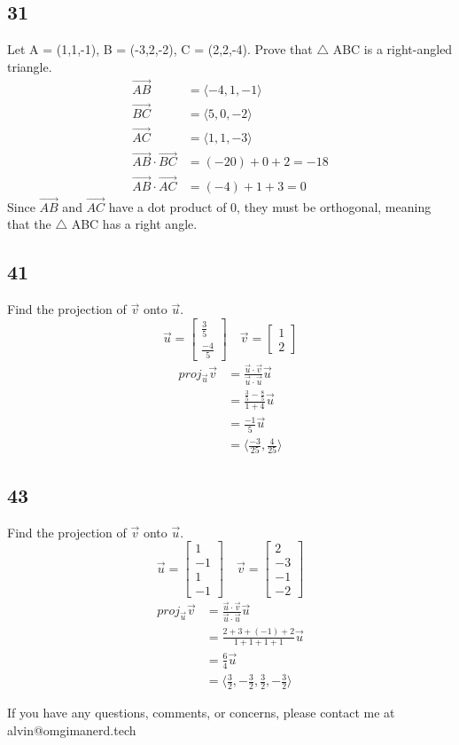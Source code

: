 \documentclass[letterpaper, 12pt]{math}
\begin{document}
\subsection*{31}
Let A = (1,1,-1), B = (-3,2,-2), C = (2,2,-4). Prove that \( \triangle \) ABC is
a right-angled triangle.
\begin{align*}
  \vec{AB} &= \langle-4,1,-1\rangle \\
  \vec{BC} &= \langle5,0,-2\rangle \\
  \vec{AC} &= \langle1,1,-3\rangle \\
  \vec{AB}\cdot\vec{BC} &= (-20)+0+2 = -18 \\
  \vec{AB}\cdot\vec{AC} &= (-4)+1+3 = 0
\end{align*}
Since \( \vec{AB} \) and \( \vec{AC} \) have a dot product of 0, they must be
orthogonal, meaning that the \( \triangle \) ABC has a right angle.

\subsection*{41}
Find the projection of \( \vec{v} \) onto \( \vec{u} \).
\[ \vec{u} = \begin{bmatrix}\frac{3}{5} \\ \frac{-4}{5}\end{bmatrix}\quad
  \vec{v} = \begin{bmatrix}1 \\ 2\end{bmatrix} \]
\begin{align*}
  proj_{\vec{u}}\vec{v} &=
    \frac{\vec{u}\cdot\vec{v}}{\vec{u}\cdot\vec{u}}\vec{u} \\
  &= \frac{\frac{3}{5}-\frac{8}{5}}{1+4}\vec{u} \\
  &= \frac{-1}{5}\vec{u} \\
  &= \langle\frac{-3}{25},\frac{4}{25}\rangle
\end{align*}

\subsection*{43}
Find the projection of \( \vec{v} \) onto \( \vec{u} \).
\[ \vec{u} = \begin{bmatrix}1 \\ -1 \\ 1 \\ -1\end{bmatrix}\quad
  \vec{v} = \begin{bmatrix}2 \\ -3 \\ -1 \\ -2\end{bmatrix} \]
\begin{align*}
  proj_{\vec{u}}\vec{v} &=
    \frac{\vec{u}\cdot\vec{v}}{\vec{u}\cdot\vec{u}}\vec{u} \\
  &= \frac{2+3+(-1)+2}{1+1+1+1}\vec{u} \\
  &= \frac{6}{4}\vec{u} \\
  &= \langle\frac{3}{2},-\frac{3}{2},\frac{3}{2},-\frac{3}{2}\rangle
\end{align*}

\begin{center}
  If you have any questions, comments, or concerns, please contact me at
  alvin@omgimanerd.tech
\end{center}
\end{document}
